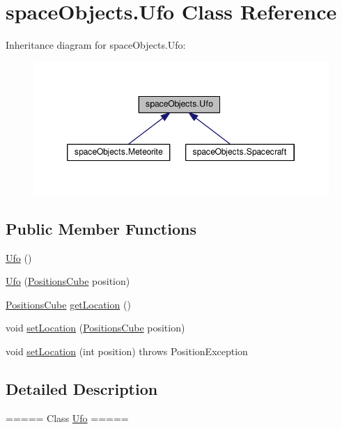 \hypertarget{classspace_objects_1_1_ufo}{}\section{space\+Objects.\+Ufo Class Reference}
\label{classspace_objects_1_1_ufo}


Inheritance diagram for space\+Objects.\+Ufo\+:\nopagebreak
\begin{figure}[H]
\begin{center}
\leavevmode
\includegraphics[width=346pt]{classspace_objects_1_1_ufo__inherit__graph}
\end{center}
\end{figure}
\subsection*{Public Member Functions}
\begin{DoxyCompactItemize}
\item 
\hyperlink{classspace_objects_1_1_ufo_a5dcb832d2c79687ffa2c199b320a8f3f}{Ufo} ()
\item 
\hyperlink{classspace_objects_1_1_ufo_af47b20fc2f0854016bd5685fe5a7177b}{Ufo} (\hyperlink{enumspace_objects_1_1_positions_cube}{Positions\+Cube} position)
\item 
\hyperlink{enumspace_objects_1_1_positions_cube}{Positions\+Cube} \hyperlink{classspace_objects_1_1_ufo_a28845916a0aab8e44687a4e2a3df45c7}{get\+Location} ()
\item 
void \hyperlink{classspace_objects_1_1_ufo_a240e9f0d9ad75cf0ebe650dd95564cb1}{set\+Location} (\hyperlink{enumspace_objects_1_1_positions_cube}{Positions\+Cube} position)
\item 
void \hyperlink{classspace_objects_1_1_ufo_a1dc5bd9259b652bac4cc0d97949b6274}{set\+Location} (int position)  throws Position\+Exception 
\end{DoxyCompactItemize}


\subsection{Detailed Description}
===== Class \hyperlink{classspace_objects_1_1_ufo}{Ufo} =====

